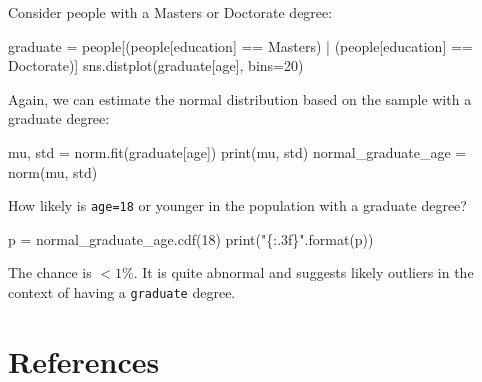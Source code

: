 \documentclass[
  letterpaper,
]{scrbook}
\newenvironment{Shaded}{\begin{snugshade}}{\end{snugshade}}
\newcommand{\BuiltInTok}[1]{\textcolor[rgb]{0.00,0.23,0.31}{#1}}
\newcommand{\DecValTok}[1]{\textcolor[rgb]{0.68,0.00,0.00}{#1}}
\newcommand{\NormalTok}[1]{\textcolor[rgb]{0.00,0.23,0.31}{#1}}
\newcommand{\OperatorTok}[1]{\textcolor[rgb]{0.37,0.37,0.37}{#1}}
\newcommand{\SpecialCharTok}[1]{\textcolor[rgb]{0.37,0.37,0.37}{#1}}
\newcommand{\StringTok}[1]{\textcolor[rgb]{0.13,0.47,0.30}{#1}}
\begin{document}
Consider people with a Masters or Doctorate degree:

\begin{Shaded}
\begin{Highlighting}[]
\NormalTok{graduate }\OperatorTok{=}\NormalTok{ people[(people[}\StringTok{\textquotesingle{}education\textquotesingle{}}\NormalTok{] }\OperatorTok{==} \StringTok{\textquotesingle{}Masters\textquotesingle{}}\NormalTok{) }\OperatorTok{|}\NormalTok{ (people[}\StringTok{\textquotesingle{}education\textquotesingle{}}\NormalTok{] }\OperatorTok{==} \StringTok{\textquotesingle{}Doctorate\textquotesingle{}}\NormalTok{)]}
\NormalTok{sns.distplot(graduate[}\StringTok{\textquotesingle{}age\textquotesingle{}}\NormalTok{], bins}\OperatorTok{=}\DecValTok{20}\NormalTok{)}
\end{Highlighting}
\end{Shaded}

Again, we can estimate the normal distribution based on the sample with
a graduate degree:

\begin{Shaded}
\begin{Highlighting}[]
\NormalTok{mu, std }\OperatorTok{=}\NormalTok{ norm.fit(graduate[}\StringTok{\textquotesingle{}age\textquotesingle{}}\NormalTok{])}
\BuiltInTok{print}\NormalTok{(mu, std)}
\NormalTok{normal\_graduate\_age }\OperatorTok{=}\NormalTok{ norm(mu, std)}
\end{Highlighting}
\end{Shaded}

How likely is \texttt{age=18} or younger in the population with a
graduate degree?

\begin{Shaded}
\begin{Highlighting}[]
\NormalTok{p }\OperatorTok{=}\NormalTok{ normal\_graduate\_age.cdf(}\DecValTok{18}\NormalTok{)}
\BuiltInTok{print}\NormalTok{(}\StringTok{"}\SpecialCharTok{\{:.3f\}}\StringTok{"}\NormalTok{.}\BuiltInTok{format}\NormalTok{(p))}
\end{Highlighting}
\end{Shaded}

The chance is \(<1\%\). It is quite abnormal and suggests likely
outliers in the context of having a \texttt{graduate} degree.

\section*{References}\label{references-3}
\end{document}
